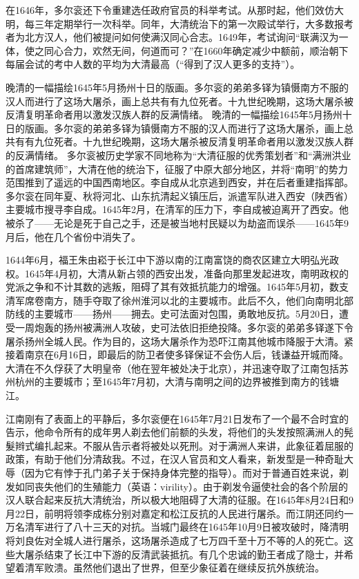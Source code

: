 在1646年，多尔衮还下令重建选任政府官员的科举考试。从那时起，他们效仿大明，每三年定期举行一次科举。同年，大清统治下的第一次殿试举行，大多数报考者为北方汉人，他们被提问如何使满汉同心合志。1649年，考试询问“联满汉为一体，使之同心合力，欢然无间，何道而可？”在1660年确定减少中额前，顺治朝下每届会试的考中人数的平均为大清最高（“得到了汉人更多的支持”）。

晚清的一幅描绘1645年5月扬州十日的版画。多尔衮的弟弟多铎为镇慑南方不服的汉人而进行了这场大屠杀，画上总共有有九位死者。十九世纪晚期，这场大屠杀被反清复明革命者用以激发汉族人群的反满情绪。
晚清的一幅描绘1645年5月扬州十日的版画。多尔衮的弟弟多铎为镇慑南方不服的汉人而进行了这场大屠杀，画上总共有有九位死者。十九世纪晚期，这场大屠杀被反清复明革命者用以激发汉族人群的反满情绪。
多尔衮被历史学家不同地称为“大清征服的优秀策划者”和“满洲洪业的首席建筑师”，大清在他的统治下，征服了中原大部分地区，并将“南明”的势力范围推到了遥远的中国西南地区。李自成从北京逃到西安，并在后者重建指挥部。多尔衮在同年夏、秋将河北、山东抗清起义镇压后，派遣军队进入西安（陕西省）主要城市搜寻李自成。1645年2月，在清军的压力下，李自成被迫离开了西安。他被杀了——无论是死于自己之手，还是被当地村民疑以为劫盗而误杀——1645年9月后，他在几个省份中消失了。

1644年6月，福王朱由崧于长江中下游以南的江南富饶的商农区建立大明弘光政权。1645年4月初，大清从新占领的西安出发，准备向那里发起进攻，南明政权的党派之争和不计其数的逃叛，阻碍了其有效抵抗能力的增强。1645年5月初，数支清军席卷南方，随手夺取了徐州淮河以北的主要城市。此后不久，他们向南明北部防线的主要城市——扬州——拥去。史可法面对包围，勇敢地反抗。5月20日，遭受一周炮轰的扬州被满洲人攻破，史可法依旧拒绝投降。多尔衮的弟弟多铎遂下令屠杀扬州全城人民。作为目的，这场大屠杀作为恐吓江南其他城市降服于大清。紧接着南京在6月16日，即最后的防卫者使多铎保证不会伤人后，钱谦益开城而降。大清在不久俘获了大明皇帝（他在翌年被处决于北京），并迅速夺取了江南包括苏州杭州的主要城市；至1645年7月初，大清与南明之间的边界被推到南方的钱塘江。

江南刚有了表面上的平静后，多尔衮便在1645年7月21日发布了一个最不合时宜的告示，他命令所有的成年男人剃去他们前额的头发，将他们的头发按照满洲人的髡髮辫式编扎起来。不服从告示者将被处以死刑。对于满洲人来讲，此象征着屈服的政策，有助于他们分清敌我。不过，在汉人官员和文人看来，新发型是一种奇耻大辱（因为它有悖于孔门弟子关于保持身体完整的指导）。而对于普通百姓来说，剃发如同丧失他们的生殖能力（英语：virility）。由于剃发令逼使社会的各个阶层的汉人联合起来反抗大清统治，所以极大地阻碍了大清的征服。在1645年8月24日和9月22日，前明将领李成栋分别对嘉定和松江反抗的人民进行屠杀。而江阴还同约一万名清军进行了八十三天的对抗。当城门最终在1645年10月9日被攻破时，降清明将刘良佐对全城人进行屠杀，这场屠杀造成了七万四千至十万不等的人的死亡。这些大屠杀结束了长江中下游的反清武装抵抗。有几个忠诚的勤王者成了隐士，并希望着清军败溃。虽然他们退出了世界，但至少象征着在继续反抗外族统治。

